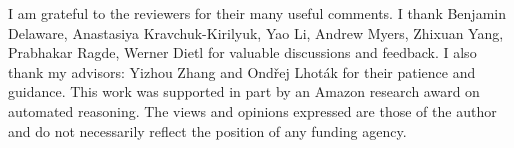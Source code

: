 \vspace*{\fill}

\newpage


\vspace*{\fill}


\vspace*{\fill}


\newpage


\vspace*{\fill}

I am grateful to the reviewers for their many useful comments.  I thank
Benjamin Delaware,
Anastasiya Kravchuk-Kirilyuk, Yao Li, Andrew Myers, Zhixuan Yang, Prabhakar Ragde, Werner Dietl
for valuable discussions and feedback. I also thank my advisors: Yizhou Zhang and Ondřej Lhoták for their patience and guidance.
This work was supported in part by an Amazon research award on automated
reasoning.
The views and opinions expressed are those of the author and do not necessarily
reflect the position of any funding agency.

\vspace*{\fill}

\newpage
\tableofcontents

\newpage 

\vspace*{\fill}


\listoffigures


\vspace*{\fill} 

\newpage 

\vspace*{\fill}



\vspace*{\fill} 






\vspace*{\fill} 